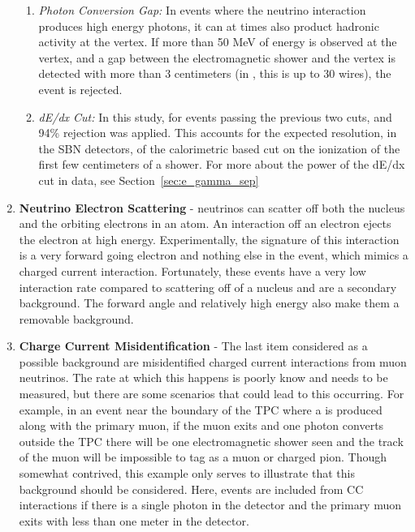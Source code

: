 \begin{enumerate}
\begin{enumerate}
    \item{\em Photon Conversion Gap:} In events where the neutrino interaction produces high energy photons, it can at times also product hadronic activity at the vertex.  If more than 50 MeV of energy is observed at the vertex, and a gap between the electromagnetic shower and the vertex is detected with more than 3 centimeters (in \uboone, this is up to 30 wires), the event is rejected.

    \item{\em dE/dx Cut:} In this study, for events passing the previous two cuts, and 94\% rejection was applied.  This accounts for the expected resolution, in the SBN detectors, of the calorimetric based cut on the ionization of the first few centimeters of a shower.  For more about the power of the dE/dx cut in data, see Section~\ref{sec:e_gamma_sep}

  \end{enumerate}


  \item {\bf Neutrino Electron Scattering}  - neutrinos can scatter off both the nucleus and the orbiting electrons in an atom. An interaction off an electron ejects the electron at high energy. Experimentally, the signature of this interaction is a very forward going electron and nothing else in the event, which mimics a \nue charged current interaction. Fortunately, these events have a very low interaction rate compared to scattering off of a nucleus and are a secondary background.  The forward angle and relatively high energy also make them a removable background.

  \item {\bf \numu Charge Current Misidentification} - The last item considered as a possible background are misidentified charged current interactions from muon neutrinos. The rate at which this happens is poorly know and needs to be measured, but there are some scenarios that could lead to this occurring. For example, in an event near the boundary of the TPC where a \pizero is produced along with the primary muon, if the muon exits and one photon converts outside the TPC there will be one electromagnetic shower seen and the track of the muon will be impossible to tag as a muon or charged pion. Though somewhat contrived, this example only serves to illustrate that this background should be considered. Here, events are included from \numu CC interactions if there is a single photon in the detector and the primary muon exits with less than one meter in the detector.
  

\end{enumerate}
